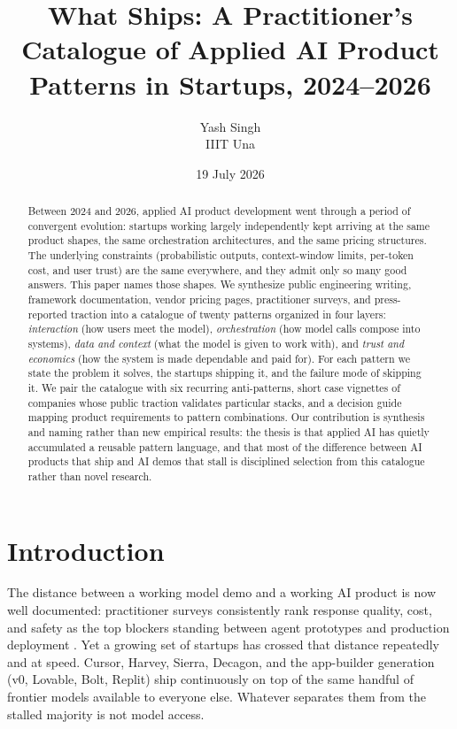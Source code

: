 \documentclass[11pt]{article}
\title{What Ships: A Practitioner's Catalogue of Applied AI Product
Patterns in Startups, 2024--2026}
\author{Yash Singh\\
\small IIIT Una}
\date{19 July 2026}
\begin{document}
\maketitle

\begin{abstract}
Between 2024 and 2026, applied AI product development went through a period of
convergent evolution: startups working largely independently kept arriving at
the same product shapes, the same orchestration architectures, and the same
pricing structures. The underlying constraints (probabilistic outputs,
context-window limits, per-token cost, and user trust) are the same
everywhere, and they admit only so many good answers. This paper names those
shapes. We synthesize public engineering writing,
framework documentation, vendor pricing pages, practitioner surveys, and
press-reported traction into a catalogue of twenty patterns organized in four
layers: \emph{interaction} (how users meet the model), \emph{orchestration}
(how model calls compose into systems), \emph{data and context} (what the model
is given to work with), and \emph{trust and economics} (how the system is made
dependable and paid for). For each pattern we state the problem it solves, the
startups shipping it, and the failure mode of skipping it. We pair the
catalogue with six recurring anti-patterns, short case vignettes of companies
whose public traction validates particular stacks, and a decision guide mapping
product requirements to pattern combinations. Our contribution is synthesis and
naming rather than new empirical results: the thesis is that applied AI has
quietly accumulated a reusable pattern language, and that most of the
difference between AI products that ship and AI demos that stall is disciplined
selection from this catalogue rather than novel research.
\end{abstract}

\section{Introduction}

The distance between a working model demo and a working AI product is now well
documented: practitioner surveys consistently rank response quality, cost, and
safety as the top blockers standing between agent prototypes and production
deployment \citep{langchain2024state}. Yet a
growing set of startups has crossed that distance repeatedly and at speed.
Cursor, Harvey, Sierra, Decagon, and the app-builder generation
(v0, Lovable, Bolt, Replit) ship continuously on top of the same handful of
frontier models available to everyone else. Whatever separates them from the stalled
majority is not model access.
\end{document}
